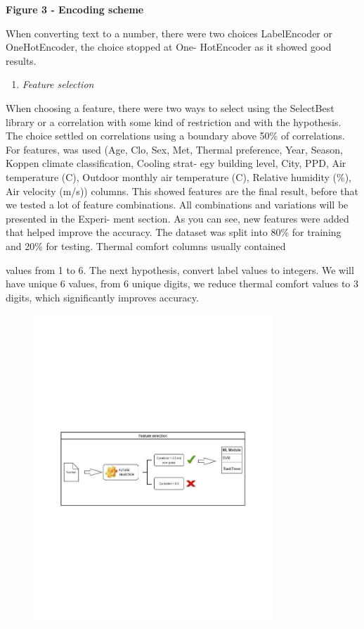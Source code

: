 {\bfseries Figure 3 - Encoding scheme}

When converting text to a number, there were two choices LabelEncoder or
OneHotEncoder, the choice stopped at One- HotEncoder as it showed good
results.

\begin{enumerate}
\def\labelenumi{\Alph{enumi}.}
\setcounter{enumi}{3}
\item
  \emph{Feature selection}
\end{enumerate}

When choosing a feature, there were two ways to select using the
SelectBest library or a correlation with some kind of restriction and
with the hypothesis. The choice settled on correlations using a boundary
above 50\% of correlations. For features, was used (Age, Clo, Sex, Met,
Thermal preference, Year, Season, Koppen climate classification, Cooling
strat- egy building level, City, PPD, Air temperature (C), Outdoor
monthly air temperature (C), Relative humidity (\%), Air velocity (m/s))
columns. This showed features are the final result, before that we
tested a lot of feature combinations. All combinations and variations
will be presented in the Experi- ment section. As you can see, new
features were added that helped improve the accuracy. The dataset was
split into 80\% for training and 20\% for testing. Thermal comfort
columns usually contained

values from 1 to 6. The next hypothesis, convert label values to
integers. We will have unique 6 values, from 6 unique digits, we reduce
thermal comfort values to 3 digits, which significantly improves
accuracy.

\begin{figure}[H]
	\centering
	\includegraphics[width=0.8\textwidth]{media/ict/image20}
	\caption*{}
\end{figure}


